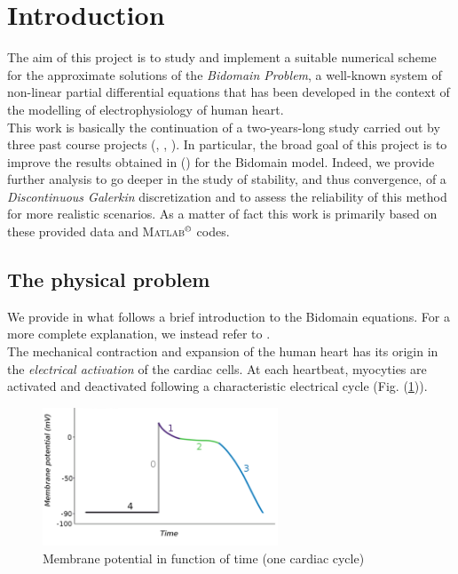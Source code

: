 \documentclass[a4paper,11pt]{article}
\begin{document}
    \section{Introduction}
    The aim of this project is to study and implement a suitable numerical scheme for the approximate solutions of the \emph{Bidomain Problem}, a well-known system of non-linear partial differential equations that has been developed in the context of the modelling of electrophysiology of human heart. \\
    This work is basically the continuation of a two-years-long study carried out by three past course projects (\cite{bagnara}, \cite{andreotti}, \cite{marta}). In particular, the broad goal of this project is to improve the results obtained in \parencite{marta} (\citeauthor{marta}) for the Bidomain model. Indeed, we provide further analysis to go deeper in the study of stability, and thus convergence, of a \emph{Discontinuous Galerkin} discretization and to assess the reliability of this method for more realistic scenarios. As a matter of fact this work is primarily based on these provided data and \textsc{Matlab}$^ \copyright$ codes.
    
    \subsection{The physical problem}
    We provide in what follows a brief introduction to the Bidomain equations. For a more complete explanation, we instead refer to \cite{acta}.\\
    The mechanical contraction and expansion of the human heart has its origin in the \emph{electrical activation} of the cardiac cells. At each heartbeat, myocyties are activated and deactivated following a characteristic electrical cycle (Fig. (\ref{potential_cycle})). 
    
    
    \begin{figure}[h]
    \begin{center}
    \includegraphics[width = 7cm]{./potential_cycle.png}
    \caption{Membrane potential in function of time (one cardiac cycle)}
    \label{potential_cycle}
    \end{center}
    \end{figure}
    
\end{document}
